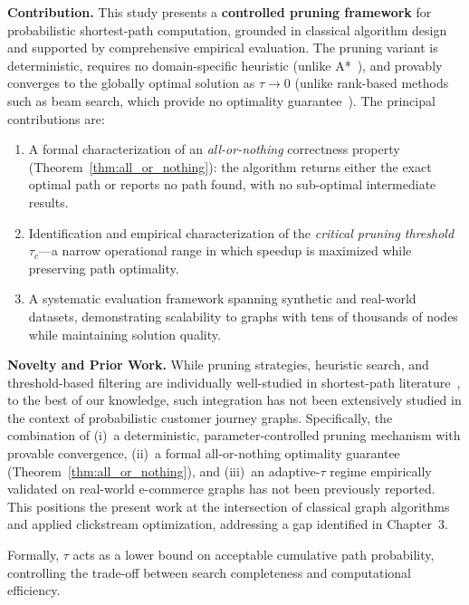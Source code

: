 \noindent\textbf{Contribution.} This study presents a \textbf{controlled pruning framework} for probabilistic shortest-path computation, grounded in classical algorithm design and supported by comprehensive empirical evaluation. The pruning variant is deterministic, requires no domain-specific heuristic (unlike A*~\citep{hart1968astar}), and provably converges to the globally optimal solution as $\tau \to 0$ (unlike rank-based methods such as beam search, which provide no optimality guarantee~\citep{lowerre1976speech,jurafsky2000speech}). The principal contributions are:
\begin{enumerate}
    \item A formal characterization of an \emph{all-or-nothing} correctness property (Theorem~\ref{thm:all_or_nothing}): the algorithm returns either the exact optimal path or reports no path found, with no sub-optimal intermediate results.
    \item Identification and empirical characterization of the \emph{critical pruning threshold}~$\tau_c$---a narrow operational range in which speedup is maximized while preserving path optimality.
    \item A systematic evaluation framework spanning synthetic and real-world datasets, demonstrating scalability to graphs with tens of thousands of nodes while maintaining solution quality.
\end{enumerate}

\medskip
\noindent\textbf{Novelty and Prior Work.} While pruning strategies, heuristic search, and threshold-based filtering are individually well-studied in shortest-path literature~\citep{hart1968astar,pearl1984heuristics,cormen2009}, to the best of our knowledge, such integration has not been extensively studied in the context of probabilistic customer journey graphs. Specifically, the combination of (i)~a deterministic, parameter-controlled pruning mechanism with provable convergence, (ii)~a formal all-or-nothing optimality guarantee (Theorem~\ref{thm:all_or_nothing}), and (iii)~an adaptive-$\tau$ regime empirically validated on real-world e-commerce graphs has not been previously reported. This positions the present work at the intersection of classical graph algorithms and applied clickstream optimization, addressing a gap identified in Chapter~3.

Formally, $\tau$ acts as a lower bound on acceptable cumulative path probability, controlling the trade-off between search completeness and computational efficiency.


